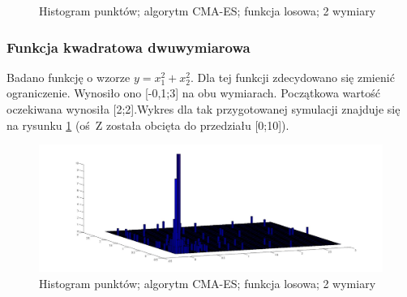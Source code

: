 \documentclass{mini}
\begin{document}
\begin{figure}[H]
\centering
{}
\quad
{}
\caption{Histogram punktów; algorytm CMA-ES; funkcja losowa; 2 wymiary}
\end{figure}

\subsubsection*{Funkcja kwadratowa dwuwymiarowa}
Badano funkcję o wzorze $y=x_1^2+x_2^2$. Dla tej funkcji zdecydowano się zmienić ograniczenie. Wynosiło ono [-0,1;3] na obu wymiarach. Początkowa wartość oczekiwana wynosiła [2;2].Wykres dla tak przygotowanej symulacji znajduje się na rysunku \ref{cmaes:x2} (oś~Z została obcięta do przedziału [0;10]).

\begin{figure}[H]
\centering
\includegraphics[width=\textwidth]{cmaes-x2dim2-boundaries-v2}
\caption{Histogram punktów; algorytm CMA-ES; funkcja losowa; 2 wymiary}
\label{cmaes:x2}
\end{figure}
\end{document}
